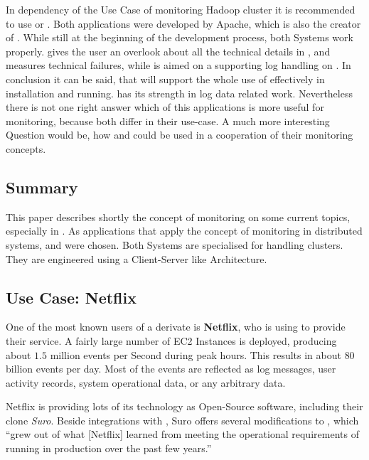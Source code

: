 In dependency of the Use Case of monitoring Hadoop cluster it is recommended to use \amb or \chuk. 
Both applications were developed by Apache, which is also the creator of \hadoop. 
While still at the beginning of the development process, both Systems work properly.
\amb gives the user an overlook about all the technical details in \hadoop, and measures technical failures, while \chuk is aimed on a supporting log handling on \hadoop. 
In conclusion it can be said, that \amb will support the whole use of \hadoop effectively in installation and running. \chuk has its strength in log data related work. 
Nevertheless there is not one right answer which of this applications is more useful for monitoring, because both differ in their use-case. 
A much more interesting Question would be, how \amb and \chuk could be used in a cooperation of their monitoring concepts.


\subsection{Summary}
This paper describes shortly the concept of monitoring on some current topics, especially in \isds. 
As applications that apply the concept of monitoring in distributed systems, \amb and \chuk were chosen. 
Both Systems are specialised for handling \hadoop clusters.
They are engineered using a Client-Server like Architecture.

\subsection{Use Case: Netflix}
\label{netflix}
One of the most known users of a \chuk derivate is \textbf{Netflix}, who is using \aws to provide their service. 
A fairly large number of \aws EC2 Instances is deployed, producing about $1.5$ million events per Second during peak hours. 
This results in about $80$ billion events per day. 
Most of the events are reflected as log messages, user activity records, system operational data, or any arbitrary data.~\cite{Bae2013}

Netflix is providing lots of its technology as Open-Source software, including their \chuk clone \textit{Suro}. 
Beside integrations with \noss, Suro offers several modifications to \chuk, which ``grew out of what [Netflix] learned from meeting the operational requirements of running in production over the past few years.''~\cite{Bae2013}

